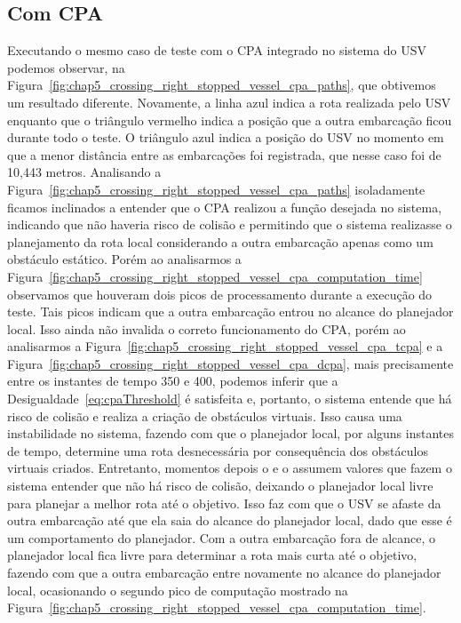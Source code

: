         \subsection{Com CPA}\label{subsection_crossing_right_stopped_vessel_cpa}
            Executando o mesmo caso de teste com o CPA integrado no sistema do USV podemos observar, na Figura~\ref{fig:chap5_crossing_right_stopped_vessel_cpa_paths}, que obtivemos um resultado diferente. Novamente, a linha azul indica a rota realizada pelo USV enquanto que o triângulo vermelho indica a posição que a outra embarcação ficou durante todo o teste. O triângulo azul indica a posição do USV no momento em que a menor distância entre as embarcações foi registrada, que nesse caso foi de 10,443 metros. Analisando a Figura~\ref{fig:chap5_crossing_right_stopped_vessel_cpa_paths} isoladamente ficamos inclinados a entender que o CPA realizou a função desejada no sistema, indicando que não haveria risco de colisão e permitindo que o sistema realizasse o planejamento da rota local considerando a outra embarcação apenas como um obstáculo estático. Porém ao analisarmos a Figura~\ref{fig:chap5_crossing_right_stopped_vessel_cpa_computation_time} observamos que houveram dois picos de processamento durante a execução do teste. Tais picos indicam que a outra embarcação entrou no alcance do planejador local. Isso ainda não invalida o correto funcionamento do CPA, porém ao analisarmos a Figura~\ref{fig:chap5_crossing_right_stopped_vessel_cpa_tcpa} e a Figura~\ref{fig:chap5_crossing_right_stopped_vessel_cpa_dcpa}, mais precisamente entre os instantes de tempo 350 e 400, podemos inferir que a Desigualdade~\ref{eq:cpaThreshold} é satisfeita e, portanto, o sistema entende que há risco de colisão e realiza a criação de obstáculos virtuais. Isso causa uma instabilidade no sistema, fazendo com que o planejador local, por alguns instantes de tempo, determine uma rota desnecessária por consequência dos obstáculos virtuais criados. Entretanto, momentos depois o \tcpa e o \dcpa assumem valores que fazem o sistema entender que não há risco de colisão, deixando o planejador local livre para planejar a melhor rota até o objetivo. Isso faz com que o USV se afaste da outra embarcação até que ela saia do alcance do planejador local, dado que esse é um comportamento do planejador. Com a outra embarcação fora de alcance, o planejador local fica livre para determinar a rota mais curta até o objetivo, fazendo com que a outra embarcação entre novamente no alcance do planejador local, ocasionando o segundo pico de computação mostrado na Figura~\ref{fig:chap5_crossing_right_stopped_vessel_cpa_computation_time}.
        
